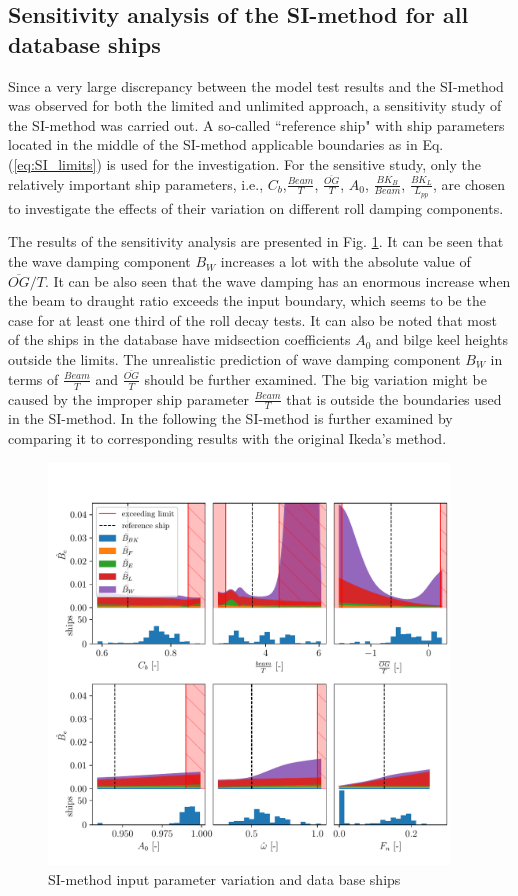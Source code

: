 \subsection{Sensitivity analysis of the SI-method for all database ships}
\label{se:accuracy_SI_method}
Since a very large discrepancy between the model test results and the SI-method was observed for both the limited and unlimited approach, a sensitivity study of the SI-method was carried out. A so-called ``reference ship" with ship parameters located in the middle of the SI-method applicable boundaries as in Eq. (\ref{eq:SI_limits}) is used for the investigation. For the sensitive study, only the relatively important ship parameters, i.e., $C_b$,$\frac{Beam}{T}$, $\frac{\overline{OG}}{T}$, $A_0$, $\frac{BK_B}{Beam}$, $\frac{BK_L}{L_{pp}}$, are chosen to investigate the effects of their variation on different roll damping components.

The results of the sensitivity analysis are presented in Fig. \ref{fig:SI_sensitivity}. It can be seen that the wave damping component $B_W$ increases a lot with the absolute value of $\overline{OG}/T$. It can be also seen that the wave damping has an enormous increase when the beam to draught ratio exceeds the input boundary, which seems to be the case for at least one third of the roll decay tests. It can also be noted that most of the ships in the database have midsection coefficients $A_0$ and bilge keel heights outside the limits. The unrealistic prediction of wave damping component $B_W$ in terms of $\frac{Beam}{T}$ and $\frac{\overline{OG}}{T}$ should be further examined. The big variation might be caused by the improper ship parameter $\frac{Beam}{T}$ that is outside the boundaries used in the SI-method. In the following the SI-method is further examined by comparing it to corresponding results with the original Ikeda's method.

\begin{figure}[H]
    \centering
    \includegraphics[width=0.95\textwidth]{figures/SI-sensitivity.pdf}
        \vspace{-0.1cm}
    \caption{SI-method input parameter variation and data base ships}
    \label{fig:SI_sensitivity}
\end{figure}
